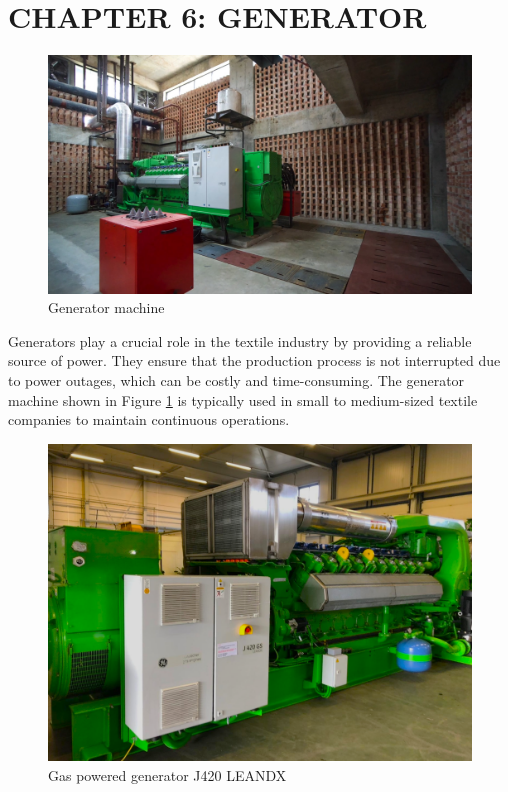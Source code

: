 \section{CHAPTER 6: GENERATOR \cite{j420}}
\begin{figure}[h!]
    \centering
    \includegraphics[width=1\linewidth]{figs/generator.jpg}
    \caption{Generator machine}
    \label{fig:generator}
\end{figure}

Generators play a crucial role in the textile industry by providing a reliable source of power. They ensure that the production process is not interrupted due to power outages, which can be costly and time-consuming. The generator machine shown in Figure \ref{fig:generator} is typically used in small to medium-sized textile companies to maintain continuous operations.

\begin{figure}
    \centering
    \includegraphics[width=1\linewidth]{figs/gas_gen_j420_leandx.png}
    \caption{Gas powered generator J420 LEANDX}
    \label{fig:gas_gen}
\end{figure}

